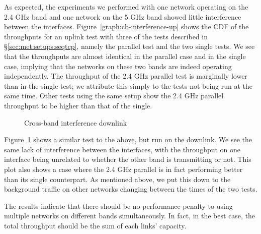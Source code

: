 As expected, the experiments we performed with one network operating on the 2.4
GHz band and one network on the 5 GHz band showed little interference between
the interfaces.  Figure~\ref{graph:cb-interference-up} shows the CDF of the
throughputs for an uplink test with three of the tests described in 
\S\ref{sec:met:setups:seqtcp}, namely the parallel test and the two single tests.
 We see that the throughputs are almost identical in the parallel case and in 
the single case, implying that the networks on these two bands are indeed 
operating independently. The throughput of the 2.4 GHz parallel test is 
marginally lower than in the single test; we attribute this simply to the tests 
not being run at the same time. Other tests using the same setup show the 2.4 
GHz parallel throughput to be higher than that of the single.

\begin{figure}[h]
 \centering
 
 \caption{Cross-band interference downlink}\label{graph:cb-interference-down}
\end{figure}


Figure~\ref{graph:cb-interference-down} shows a similar test to the above, but
run on the downlink. We see the same lack of interference between the
interfaces, with the throughput on one interface being unrelated to whether the
other band is transmitting or not. This plot also shows a case where the 2.4 GHz
parallel is in fact performing better than its single counterpart. As mentioned
above, we put this down to the background traffic on other networks changing
between the times of the two tests.

The results indicate that there should be no performance penalty to using
multiple networks on different bands simultaneously. In fact, in the best case,
the total throughput should be the sum of each links' capacity.

